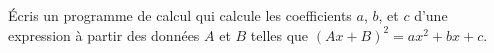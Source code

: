 
Écris un programme de calcul qui calcule les coefficients $a$, $b$, et $c$ d'une expression à partir des données $A$ et $B$ telles que $(Ax+B)^2=ax^2+bx+c$.
